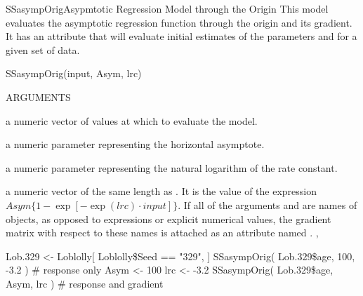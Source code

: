\documentclass[pdftex]{article} \usepackage{url,graphicx}
\begin{document}
\begin{Helpfile}{SSasympOrig}{Asypmtotic Regression Model through the Origin}
This  model evaluates the asymptotic regression
function through the origin and its gradient.  It has an
 attribute that will evaluate initial estimates of the
parameters  and  for a given set of data.
\begin{Example}
SSasympOrig(input, Asym, lrc)
\end{Example}
\begin{Argument}{ARGUMENTS}
\item[\Co{input:}]
a numeric vector of values at which to evaluate the model.
\item[\Co{Asym:}]
a numeric parameter representing the horizontal asymptote.
\item[\Co{lrc:}]
a numeric parameter representing the natural logarithm of
the rate constant.
\end{Argument}
a numeric vector of the same length as .  It is the value of
the expression $Asym\{1 - \exp[-\exp(lrc) \cdot input]\}$.  If all of
the arguments  and  are
names of objects, as opposed to expressions or explicit numerical
values, the gradient matrix with respect to these names is attached as
an attribute named .
, 
\need 15pt
\vspace{-16pt} 
\begin{Example}
Lob.329 <- Loblolly[ Loblolly\$Seed == "329", ]
SSasympOrig( Lob.329\$age, 100, -3.2 )  # response only
Asym <- 100
lrc <- -3.2
SSasympOrig( Lob.329\$age, Asym, lrc ) # response and gradient
\end{Example}
\end{Helpfile}
\end{document}
